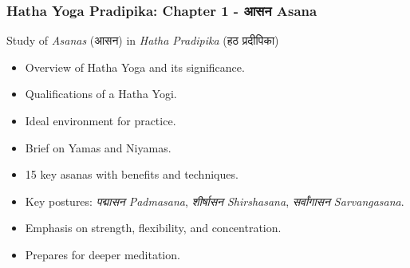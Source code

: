 \begin{frame}[fragile]\frametitle{Hatha Yoga Pradipika: Chapter 1 - आसन  Asana}

Study of \textit{Asanas} (आसन) in \textit{Hatha Pradipika} (हठ प्रदीपिका)

\begin{itemize}
    \item Overview of Hatha Yoga and its significance.
    \item Qualifications of a Hatha Yogi.
    \item Ideal environment for practice.
    \item Brief on Yamas and Niyamas.
    \item 15 key asanas with benefits and techniques.
    \item Key postures: \textit{पद्मासन Padmasana}, \textit{शीर्षासन Shirshasana}, \textit{सर्वांगासन Sarvangasana}.
    \item Emphasis on strength, flexibility, and concentration.
    \item Prepares for deeper meditation.
\end{itemize}

\end{frame}




